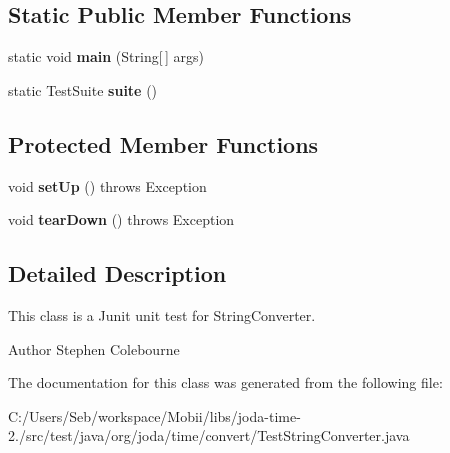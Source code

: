\subsection*{Static Public Member Functions}
\begin{DoxyCompactItemize}
\item 
\hypertarget{classorg_1_1joda_1_1time_1_1convert_1_1_test_string_converter_a04a140ca3347296f4eb87024b5d8095f}{static void {\bfseries main} (String\mbox{[}$\,$\mbox{]} args)}\label{classorg_1_1joda_1_1time_1_1convert_1_1_test_string_converter_a04a140ca3347296f4eb87024b5d8095f}

\item 
\hypertarget{classorg_1_1joda_1_1time_1_1convert_1_1_test_string_converter_a54fffa90770999eb3a4d856a52acbe20}{static Test\-Suite {\bfseries suite} ()}\label{classorg_1_1joda_1_1time_1_1convert_1_1_test_string_converter_a54fffa90770999eb3a4d856a52acbe20}

\end{DoxyCompactItemize}
\subsection*{Protected Member Functions}
\begin{DoxyCompactItemize}
\item 
\hypertarget{classorg_1_1joda_1_1time_1_1convert_1_1_test_string_converter_a25b77b35273687524fa031a06d0f991c}{void {\bfseries set\-Up} ()  throws Exception }\label{classorg_1_1joda_1_1time_1_1convert_1_1_test_string_converter_a25b77b35273687524fa031a06d0f991c}

\item 
\hypertarget{classorg_1_1joda_1_1time_1_1convert_1_1_test_string_converter_afb9996f21b1def8c4a647bd9a4e65c13}{void {\bfseries tear\-Down} ()  throws Exception }\label{classorg_1_1joda_1_1time_1_1convert_1_1_test_string_converter_afb9996f21b1def8c4a647bd9a4e65c13}

\end{DoxyCompactItemize}


\subsection{Detailed Description}
This class is a Junit unit test for String\-Converter.

\begin{DoxyAuthor}{Author}
Stephen Colebourne 
\end{DoxyAuthor}


The documentation for this class was generated from the following file\-:\begin{DoxyCompactItemize}
\item 
C\-:/\-Users/\-Seb/workspace/\-Mobii/libs/joda-\/time-\/2./src/test/java/org/joda/time/convert/Test\-String\-Converter.\-java\end{DoxyCompactItemize}
